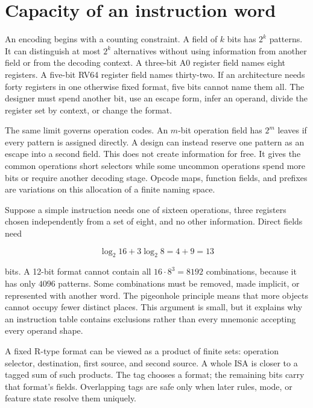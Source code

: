 \section{Capacity of an instruction word}

An encoding begins with a counting constraint. A field of \(k\) bits has
\(2^k\) patterns. It can distinguish at most \(2^k\) alternatives without
using information from another field or from the decoding context. A three-bit
A0 register field names eight registers. A five-bit RV64 register field names
thirty-two. If an architecture needs forty registers in one otherwise fixed
format, five bits cannot name them all. The designer must spend another bit,
use an escape form, infer an operand, divide the register set by context, or
change the format.

The same limit governs operation codes. An \(m\)-bit operation field has
\(2^m\) leaves if every pattern is assigned directly. A design can instead
reserve one pattern as an escape into a second field. This does not create
information for free. It gives the common operations short selectors while
some uncommon operations spend more bits or require another decoding stage.
Opcode maps, function fields, and prefixes are variations on this allocation
of a finite naming space.

Suppose a simple instruction needs one of sixteen operations, three registers
chosen independently from a set of eight, and no other information. Direct
fields need

\[
  \log_2 16 + 3\log_2 8 = 4+9=13
\]

bits. A 12-bit format cannot contain all \(16\cdot 8^3=8192\) combinations,
because it has only \(4096\) patterns. Some combinations must be removed,
made implicit, or represented with another word. The pigeonhole principle
means that more objects cannot occupy fewer distinct places. This argument is
small, but it explains why an instruction table contains exclusions rather
than every mnemonic accepting every operand shape.

\begin{goingdeeper}[title={Formats are tagged products}]
A fixed R-type format can be viewed as a product of finite sets: operation
selector, destination, first source, and second source. A whole ISA is closer
to a tagged sum of such products. The tag chooses a format; the remaining
bits carry that format's fields. Overlapping tags are safe only when later
rules, mode, or feature state resolve them uniquely.
\end{goingdeeper}

